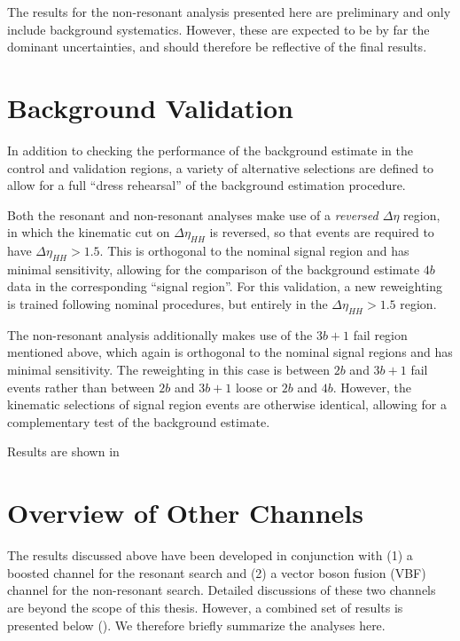 The results for the non-resonant analysis presented here are preliminary and only include 
background systematics. However, these are expected to be by far the dominant uncertainties, 
and should therefore be reflective of the final results.

\FloatBarrier
\clearpage
\section{Background Validation}
In addition to checking the performance of the background estimate in the control and 
validation regions, a variety of alternative selections are defined to allow for a 
full ``dress rehearsal'' of the background estimation procedure. 

Both the resonant and non-resonant analyses make use of a \emph{reversed $\Delta \eta$}
region, in which the kinematic cut on $\Delta \eta_{HH}$ is reversed, so that events are
required to have $\Delta \eta_{HH} > 1.5$. This is orthogonal to the nominal signal 
region and has minimal sensitivity, allowing for the comparison of the background
estimate $4b$ data in the corresponding ``signal region''. For this validation, 
a new reweighting is trained following nominal procedures, but entirely in the 
$\Delta \eta_{HH} > 1.5$ region.

The non-resonant analysis additionally makes use of the $3b+1$ fail region mentioned 
above, which again is orthogonal to the nominal signal regions and has minimal sensitivity.
The reweighting in this case is between $2b$ and $3b+1$ fail events rather than between 
$2b$ and $3b+1$ loose or $2b$ and $4b$. However, the kinematic selections of signal 
region events are otherwise identical, allowing for a complementary test of the 
background estimate.


Results are shown in 

\FloatBarrier
\clearpage
\section{Overview of Other \bbbb Channels}
The results discussed above have been developed in conjunction with (1) a boosted channel 
for the resonant search and (2) a vector boson fusion (VBF) channel for the non-resonant search. 
Detailed discussions of these two channels are beyond the scope of this thesis. However, a combined
set of results is presented below (). We therefore briefly 
summarize the analyses here.

